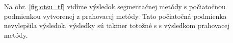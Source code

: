 \documentclass[a4paper,11pt,oneside]{article}%
\begin{document}
Na obr. \ref{fig:otsu_tf} vidíme výsledok segmentačnej metódy s počiatočnou podmienkou vytvorenej z prahovacej metódy. Tato počiatočná podmienka nevylepšila výsledok, výsledky sú takmer totožné s s výsledkom prahovacej metódy. 

\begin{figure}[H]  
    \hspace{5px}

\end{figure}
\end{document}
